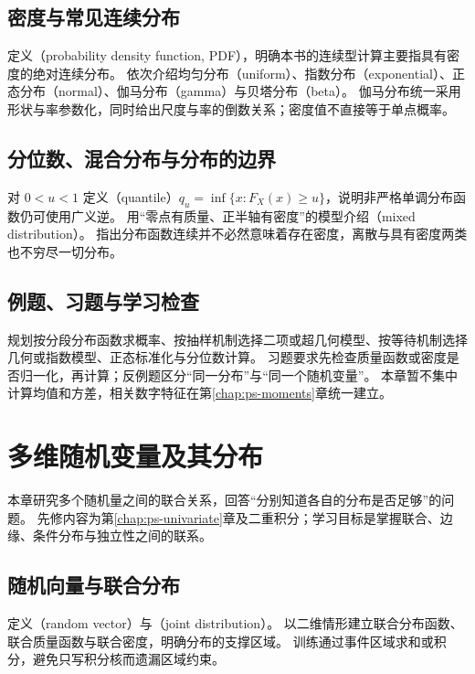 \documentclass[UTF8,12pt,a4paper,fontset=fandol]{ctexbook}
\begin{document}
\section{密度与常见连续分布}
\label{sec:ps-continuous-distributions}
定义（probability density function, PDF），明确本书的连续型计算主要指具有密度的绝对连续分布。
依次介绍均匀分布（uniform）、指数分布（exponential）、正态分布（normal）、伽马分布（gamma）与贝塔分布（beta）。
伽马分布统一采用形状与率参数化，同时给出尺度与率的倒数关系；密度值不直接等于单点概率。

\section{分位数、混合分布与分布的边界}
\label{sec:ps-quantiles-mixtures}
对 $0<u<1$ 定义（quantile）$q_u=\inf\{x:F_X(x)\geq u\}$，说明非严格单调分布函数仍可使用广义逆。
用“零点有质量、正半轴有密度”的模型介绍（mixed distribution）。
指出分布函数连续并不必然意味着存在密度，离散与具有密度两类也不穷尽一切分布。

\section{例题、习题与学习检查}
规划按分段分布函数求概率、按抽样机制选择二项或超几何模型、按等待机制选择几何或指数模型、正态标准化与分位数计算。
习题要求先检查质量函数或密度是否归一化，再计算；反例题区分“同一分布”与“同一个随机变量”。
本章暂不集中计算均值和方差，相关数字特征在第\ref{chap:ps-moments}章统一建立。


\chapter{多维随机变量及其分布}
\label{chap:ps-multivariate}

本章研究多个随机量之间的联合关系，回答“分别知道各自的分布是否足够”的问题。
先修内容为第\ref{chap:ps-univariate}章及二重积分；学习目标是掌握联合、边缘、条件分布与独立性之间的联系。

\section{随机向量与联合分布}
\label{sec:ps-joint-distributions}
定义（random vector）与（joint distribution）。
以二维情形建立联合分布函数、联合质量函数与联合密度，明确分布的支撑区域。
训练通过事件区域求和或积分，避免只写积分核而遗漏区域约束。
\end{document}
